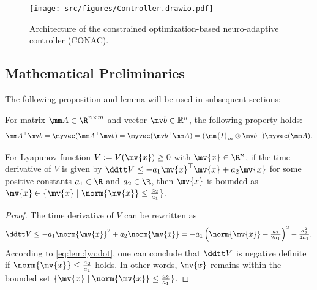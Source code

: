 \documentclass[lettersize,journal]{IEEEtran}
\begin{document}
\begin{figure}[!t]
    \centering
    \texttt{[image: src/figures/Controller.drawio.pdf]}
    \caption{Architecture of the constrained optimization-based neuro-adaptive controller (CONAC). }
    \label{fig:ctrl:diagram}
\end{figure}

\subsection{Mathematical Preliminaries}\label{sec:sub:math preliminaries}

The following proposition and lemma will be used in subsequent sections:

\begin{propsit} \label{propsit:kron}
	For matrix $\mm A\in\R^{n\times m}$ and vector $\mv b\in\mathbb R^n$, the following property holds:
	\begin{equation}
		\mm A^\top \mv b 
		= 
		\myvec(\mm A^\top\mv b)
		=
		\myvec(\mv b^\top\mm A)
		= 
		(\mm{I}_{m}\otimes \mv b^\top) \myvec(\mm A)
		.
	\end{equation}
\end{propsit}


\begin{lem} \label{lem:stable:set}
    For Lyapunov function $V:=V(\mv{x})\ge0$ with $\mv{x}\in\R^n$, if the time derivative of $V$ is given by $\ddtt V\le -a_1 \mv{x}^\top \mv{x} + a_2 \mv{x}$ for some positive constants $a_1\in\R$ and $a_2\in\R$, then $\mv{x}$ is bounded as $\mv{x}\in\{\mv{x}\mid\norm{\mv{x}}\le\tfrac{a_2}{a_1}\}$.
\end{lem}

\begin{proof}
    The time derivative of $V$ can be rewritten as
    \begin{equation}
        \ddtt V
        \le
        -a_1 \norm{\mv{x}}^2 + a_2 \norm{\mv{x}}
        =
        -a_1
        \left(
            \norm{\mv{x}}-\tfrac{a_2}{2a_1}
        \right)^2
        -
        \tfrac{a_2^2}{4a_1}
        .
        \label{eq:lem:lya:dot}
    \end{equation}
    According to \eqref{eq:lem:lya:dot}, one can conclude that $\ddtt V$ is negative definite if $\norm{\mv{x}}\le\tfrac{a_2}{a_1}$ holds.
    In other words, $\mv{x}$ remains within the bounded set $\{\mv{x}\mid\norm{\mv{x}}\le\tfrac{a_2}{a_1}\}$.
\end{proof}
\end{document}
